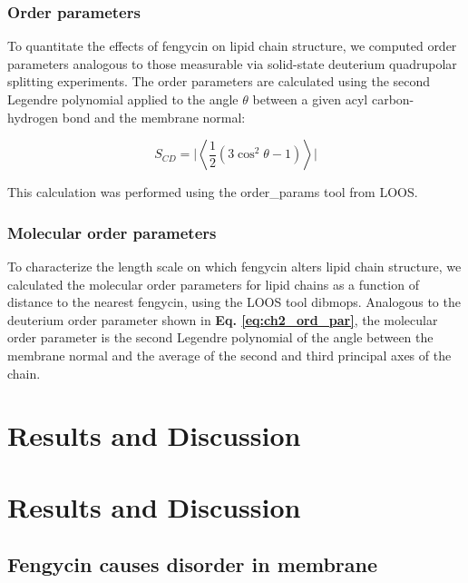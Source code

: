 \subsubsection{Order parameters}
\label{sss:ch2_ord_param}

To quantitate the effects of fengycin on lipid chain structure, we computed
order parameters analogous to those measurable via solid-state deuterium quadrupolar
splitting experiments. The order parameters are calculated using the second
Legendre polynomial applied to the angle $\theta$ between a
given acyl carbon-hydrogen bond and the membrane normal:

\begin{equation}
\label{eq:ch2_ord_par}
S_{CD} = \bigg |\left\langle \frac{1}{2} \left( 3 \cos^2 \theta - 1 \right)\right\rangle \bigg |
\end{equation}

This calculation was performed using the order\_params tool from LOOS. \cite{Grossfield2014,Grossfield2009}

\subsubsection{Molecular order parameters}
\label{sss:ch2_dibmop}

To characterize the length scale on which fengycin alters lipid chain structure,
we calculated the molecular order parameters for lipid chains as a function of
distance to the nearest fengycin, using the LOOS tool dibmops.\cite{Grossfield2014,Grossfield2009}
Analogous to the deuterium order parameter shown in \textbf{Eq. \ref{eq:ch2_ord_par}},
the molecular order parameter is the second Legendre polynomial of the angle between the membrane normal
and the average of the second and third principal axes of the chain.

\section{Results and Discussion}

\section{Results and Discussion}
  
\label{s:ch2_results}
\subsection{Fengycin causes disorder in membrane}


